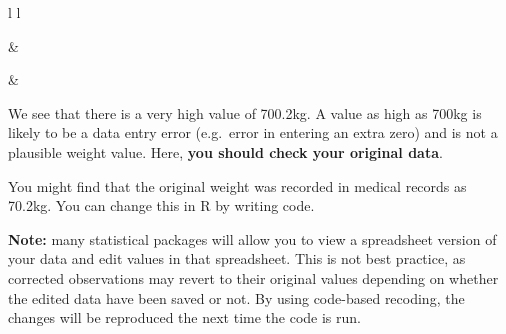 \documentclass[
]{memoir}
\begin{document}
\begin{table}[ht]
\begin{centerbox}
\begin{threeparttable}
\captionsetup{justification=centering,singlelinecheck=off}
\caption{\label{tab:unnamed-chunk-55} }
 \setlength{\tabcolsep}{0pt}
\begin{tabular}{l l}



 &
 \tabularnewline[-0.5pt]



 &
 \tabularnewline[-0.5pt]


\end{tabular}
\end{threeparttable}\par\end{centerbox}

\end{table}
 

We see that there is a very high value of 700.2kg. A value as high as 700kg is likely to be a data entry error (e.g.~error in entering an extra zero) and is not a plausible weight value. Here, \textbf{you should check your original data}.

You might find that the original weight was recorded in medical records as 70.2kg. You can change this in R by writing code.

\textbf{Note:} many statistical packages will allow you to view a spreadsheet version of your data and edit values in that spreadsheet. This is not best practice, as corrected observations may revert to their original values depending on whether the edited data have been saved or not. By using code-based recoding, the changes will be reproduced the next time the code is run.
\end{document}
